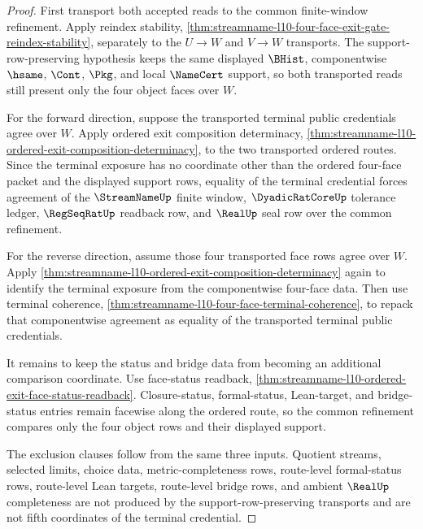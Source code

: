 \begin{proof}
First transport both accepted reads to the common finite-window refinement. Apply reindex stability, \autoref{thm:streamname-l10-four-face-exit-gate-reindex-stability}, separately to the $U \to W$ and $V \to W$ transports. The support-row-preserving hypothesis keeps the same displayed $\BHist$, componentwise $\hsame$, $\Cont$, $\Pkg$, and local $\NameCert$ support, so both transported reads still present only the four object faces over $W$.

For the forward direction, suppose the transported terminal public credentials agree over $W$. Apply ordered exit composition determinacy, \autoref{thm:streamname-l10-ordered-exit-composition-determinacy}, to the two transported ordered routes. Since the terminal exposure has no coordinate other than the ordered four-face packet and the displayed support rows, equality of the terminal credential forces agreement of the $\StreamNameUp$ finite window, $\DyadicRatCoreUp$ tolerance ledger, $\RegSeqRatUp$ readback row, and $\RealUp$ seal row over the common refinement.

For the reverse direction, assume those four transported face rows agree over $W$. Apply \autoref{thm:streamname-l10-ordered-exit-composition-determinacy} again to identify the terminal exposure from the componentwise four-face data. Then use terminal coherence, \autoref{thm:streamname-l10-four-face-terminal-coherence}, to repack that componentwise agreement as equality of the transported terminal public credentials.

It remains to keep the status and bridge data from becoming an additional comparison coordinate. Use face-status readback, \autoref{thm:streamname-l10-ordered-exit-face-status-readback}. Closure-status, formal-status, Lean-target, and bridge-status entries remain facewise along the ordered route, so the common refinement compares only the four object rows and their displayed support.

The exclusion clauses follow from the same three inputs. Quotient streams, selected limits, choice data, metric-completeness rows, route-level formal-status rows, route-level Lean targets, route-level bridge rows, and ambient $\RealUp$ completeness are not produced by the support-row-preserving transports and are not fifth coordinates of the terminal credential.
\end{proof}

